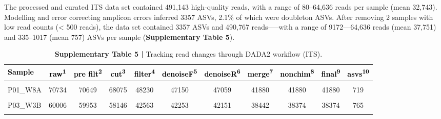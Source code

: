 \documentclass[
  10pt,
  letterpaper,
  DIV=11,
  numbers=noendperiod]{scrartcl}
\begin{document}
The processed and curated ITS data set contained 491,143 high-quality
reads, with a range of 80--64,636 reads per sample (mean 32,743).
Modelling and error correcting amplicon errors inferred 3357 ASVs, 2.1\%
of which were doubleton ASVs. After removing 2 samples with low read
counts (\textless{} 500 reads), the data set contained 3357 ASVs and
490,767 reads-----with a range of 9172---64,636 reads (mean 37,751) and
335--1017 (mean 757) ASVs per sample (\textbf{Supplementary Table 5}).

\begin{table}[H]

\caption{\textbf{Supplementary Table 5 |} Tracking read changes through DADA2 workflow (ITS).}
\centering
\fontsize{8}{10}\selectfont
\begin{threeparttable}
\begin{tabular}[t]{lcccccccccc}
\toprule
\textcolor{black}{\textbf{Sample}} & \textcolor{black}{\textbf{raw\textsuperscript{1}}} & \textcolor{black}{\textbf{pre filt\textsuperscript{2}}} & \textcolor{black}{\textbf{cut\textsuperscript{3}}} & \textcolor{black}{\textbf{filter\textsuperscript{4}}} & \textcolor{black}{\textbf{denoiseF\textsuperscript{5}}} & \textcolor{black}{\textbf{denoiseR\textsuperscript{6}}} & \textcolor{black}{\textbf{merge\textsuperscript{7}}} & \textcolor{black}{\textbf{nonchim\textsuperscript{8}}} & \textcolor{black}{\textbf{final\textsuperscript{9}}} & \textcolor{black}{\textbf{asvs\textsuperscript{10}}}\\
\midrule
\cellcolor{gray!6}{P01\_W3A} & \cellcolor{gray!6}{50894} & \cellcolor{gray!6}{50882} & \cellcolor{gray!6}{50419} & \cellcolor{gray!6}{35999} & \cellcolor{gray!6}{32635} & \cellcolor{gray!6}{33389} & \cellcolor{gray!6}{29795} & \cellcolor{gray!6}{29794} & \cellcolor{gray!6}{29794} & \cellcolor{gray!6}{945}\\
P01\_W8A & 70734 & 70649 & 68075 & 48230 & 47150 & 47059 & 41880 & 41880 & 41880 & 719\\
\cellcolor{gray!6}{P02\_C0A} & \cellcolor{gray!6}{74581} & \cellcolor{gray!6}{74557} & \cellcolor{gray!6}{73994} & \cellcolor{gray!6}{58956} & \cellcolor{gray!6}{58018} & \cellcolor{gray!6}{58130} & \cellcolor{gray!6}{51144} & \cellcolor{gray!6}{51144} & \cellcolor{gray!6}{51144} & \cellcolor{gray!6}{1011}\\
\addlinespace
P03\_W3B & 60006 & 59953 & 58146 & 42563 & 42253 & 42151 & 38442 & 38374 & 38374 & 765\\
\cellcolor{gray!6}{P03\_W8B} & \cellcolor{gray!6}{31174} & \cellcolor{gray!6}{31029} & \cellcolor{gray!6}{25782} & \cellcolor{gray!6}{17548} & \cellcolor{gray!6}{17132} & \cellcolor{gray!6}{17210} & \cellcolor{gray!6}{14188} & \cellcolor{gray!6}{14188} & \cellcolor{gray!6}{14188} & \cellcolor{gray!6}{349}\\

\end{tabular}
\end{threeparttable}
\end{table}
\end{document}
